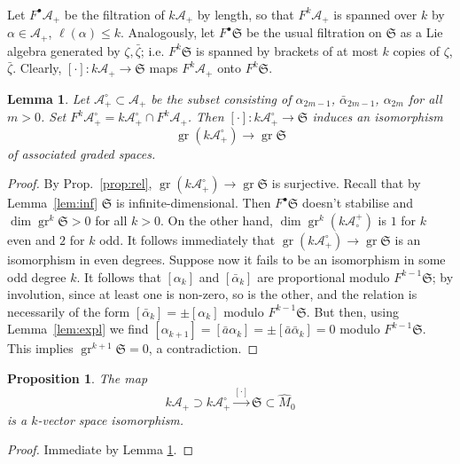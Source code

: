 \documentclass{article}
\def\fS{\mathfrak{S}}
\def\sA{\mathcal{A}}
\DeclareMathOperator{\gr}{\mathrm{gr}}
\newtheorem{lem}{Lemma}
\newtheorem{prop}{Proposition}
\theoremstyle{definition}
\begin{document}
\subsubsection{}
Let $F^\bullet \sA_+$ be 
the filtration of $k\sA_+$ by length, so that $F^k\sA_+$
is spanned over $k$ by $\alpha\in\sA_+$, $\ell(\alpha)\le k$.
Analogously, let $F^\bullet\fS$ be the usual filtration
on $\fS$ as a Lie algebra generated by $\zeta,\bar\zeta$;
i.e. $F^k\fS$ is spanned by brackets of at most
$k$ copies of $\zeta$, $\bar\zeta$. Clearly, $[\cdot]:k\sA_+\to \fS$
maps $F^k\sA_+$ onto $F^k\fS$.

\begin{lem}\label{lem:indep}
Let $\sA_+^\circ \subset \sA_+$
be the subset consisting of
$\alpha_{2m-1}$, $\bar\alpha_{2m-1}$, $\alpha_{2m}$ for all $m>0$.
Set $F^k\sA_+^\circ = k\sA_+^\circ \cap F^k\sA_+$.
Then $[\cdot]:k\sA_+^\circ \to \fS$
induces an \emph{isomorphism}
$$
 \gr (k\sA_+^\circ) \to \gr\fS
$$
of associated graded spaces.
\end{lem}
\begin{proof}
        By Prop.~\ref{prop:rel}, $\gr(k\sA^\circ_+) \to \gr\fS$
        is surjective. Recall that by Lemma~\ref{lem:inf} $\fS$ is infinite-dimensional. 
        Then $F^\bullet \fS$ doesn't stabilise and $\dim\gr^k\fS>0$
        for all $k>0$. On the other hand, $\dim\gr^k(k\sA^+_\circ)$
        is $1$ for $k$ even and $2$ for $k$ odd. It follows immediately that
        $\gr(k\sA^\circ_+)\to\gr\fS$ is an isomorphism in even degrees. 
        Suppose now it fails to be an isomorphism in some odd degree $k$.
        It follows that
        $[\alpha_k]$ and $[\bar\alpha_k]$ are proportional modulo $F^{k-1}\fS$;
        by involution, since at least one is non-zero, so is the other, and the
        relation is necessarily of the form $[\bar\alpha_k]=\pm[\alpha_k]$ modulo $F^{k-1}\fS$.
        But then, using Lemma~\ref{lem:expl} we find $[\alpha_{k+1}]=
        [\bar a \alpha_k]=\pm[\bar a\bar\alpha_k]=0$ modulo $F^{k-1}\fS$.
        This implies $\gr^{k+1}\fS=0$, a contradiction.
\end{proof}
\begin{prop}\label{prop:indep}
The map
$$ k\sA_+\supset k\sA_+^\circ \xrightarrow{[\cdot]} \fS \subset \hat M_0 $$
is a $k$-vector space isomorphism.
\end{prop}
\begin{proof}
        Immediate by Lemma \ref{lem:indep}.
\end{proof}
\end{document}
